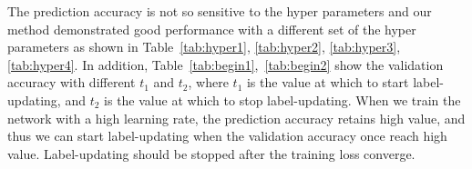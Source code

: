 \documentclass[10pt,twocolumn,letterpaper]{article}
\newcommand{\Tref}[1]{Table~\ref{#1}}
\begin{document}
The prediction accuracy is not so sensitive to the hyper parameters and our method demonstrated good performance with a different set of the hyper parameters as shown in \Tref{tab:hyper1}, \ref{tab:hyper2}, \ref{tab:hyper3}, \ref{tab:hyper4}.
In addition, \Tref{tab:begin1},~\ref{tab:begin2} show the validation accuracy with different $t_1$ and $t_2$, where $t_1$ is the value at which to start label-updating, and $t_2$ is the value at which to stop label-updating.
When we train the network with a high learning rate, the prediction accuracy retains high value, and thus we can start label-updating when the validation accuracy once reach high value. Label-updating should be stopped after the training loss converge.

\begin{table}[b]
  \vspace{-5pt}
  \caption{Validation accuracy with different hyper parameters in the triple test (experimented on AN-CIFAR with noise rate $=0.4$).}
  \centering
  \label{tab:hyper1}
\end{table}
\end{document}
